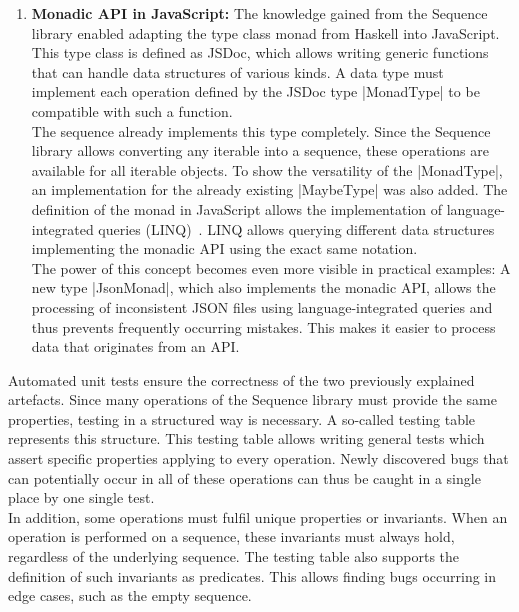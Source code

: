 \begin{enumerate}
\item \textbf{Monadic API in JavaScript:} The knowledge gained from the
  Sequence library enabled adapting the type class monad from Haskell into
  JavaScript. This type class is defined as JSDoc, which allows writing generic
  functions that can handle data structures of various kinds. 
  A data type must implement each operation defined by the JSDoc type
  |MonadType| to be compatible with such a function. \\ 
  The sequence already implements this type completely. Since the Sequence
  library allows converting any iterable into a sequence, these operations are
  available for all iterable objects. To show the versatility of the
  |MonadType|, an implementation for the already existing |MaybeType| was
  also added. The definition of the monad in JavaScript allows the
  implementation of language-integrated queries
  (LINQ)~\cite{billwagner_language-integrated_2023}. LINQ allows querying
  different data structures implementing the monadic API using the exact same
  notation. \\ 
  The power of this concept becomes even more visible in practical examples: A
  new type |JsonMonad|, which also implements the monadic API, allows the
  processing of inconsistent JSON files using language-integrated queries and
  thus prevents frequently occurring mistakes. This makes it easier to process
  data that originates from an API.
\end{enumerate}

Automated unit tests ensure the correctness of the two previously explained
artefacts. Since many operations of the Sequence library must provide the same
properties, testing in a structured way is necessary. A so-called testing
table represents this structure. This testing table allows writing general
tests which assert specific properties applying to every operation. Newly
discovered bugs that can potentially occur in all of these operations can thus
be caught in a single place by one single test.\\
In addition, some operations must fulfil unique properties or invariants. When
an operation is performed on a sequence, these invariants must always hold,
regardless of the underlying sequence. The testing table also
supports the definition of such invariants as predicates. This allows finding
bugs occurring in edge cases, such as the empty sequence.

